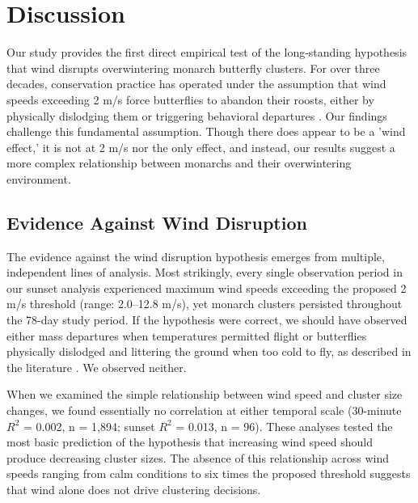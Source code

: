 \section{Discussion}

Our study provides the first direct empirical test of the long-standing hypothesis that wind disrupts overwintering monarch butterfly clusters. For over three decades, conservation practice has operated under the assumption that wind speeds exceeding 2 m/s force butterflies to abandon their roosts, either by physically dislodging them or triggering behavioral departures \parencite{leongEvaluationManagementCalifornia2016}. Our findings challenge this fundamental assumption. Though there does appear to be a 'wind effect,' it is not at 2 m/s nor the only effect, and instead, our results suggest a more complex relationship between monarchs and their overwintering environment.

\subsection{Evidence Against Wind Disruption}

The evidence against the wind disruption hypothesis emerges from multiple, independent lines of analysis. Most strikingly, every single observation period in our sunset analysis experienced maximum wind speeds exceeding the proposed 2 m/s threshold (range: 2.0--12.8 m/s), yet monarch clusters persisted throughout the 78-day study period. If the hypothesis were correct, we should have observed either mass departures when temperatures permitted flight or butterflies physically dislodged and littering the ground when too cold to fly, as described in the literature \parencite{leongRestorationOverwinteringGrove1999}. We observed neither.

When we examined the simple relationship between wind speed and cluster size changes, we found essentially no correlation at either temporal scale (30-minute $R^2$ = 0.002, n = 1,894; sunset $R^2$ = 0.013, n = 96). These analyses tested the most basic prediction of the hypothesis that increasing wind speed should produce decreasing cluster sizes. The absence of this relationship across wind speeds ranging from calm conditions to six times the proposed threshold suggests that wind alone does not drive clustering decisions.


